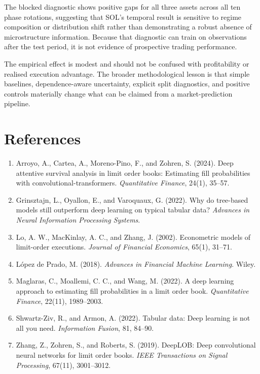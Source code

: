 \documentclass[11pt]{article}
\begin{document}
The blocked diagnostic shows positive gaps for all three assets across all ten phase rotations, suggesting that SOL's temporal result is sensitive to regime composition or distribution shift rather than demonstrating a robust absence of microstructure information. Because that diagnostic can train on observations after the test period, it is not evidence of prospective trading performance.

The empirical effect is modest and should not be confused with profitability or realised execution advantage. The broader methodological lesson is that simple baselines, dependence-aware uncertainty, explicit split diagnostics, and positive controls materially change what can be claimed from a market-prediction pipeline.

\section*{References}
\begin{enumerate}[label={},leftmargin=0pt,itemsep=0.45em,parsep=0pt]
\item Arroyo, A., Cartea, A., Moreno-Pino, F., and Zohren, S. (2024). Deep attentive survival analysis in limit order books: Estimating fill probabilities with convolutional-transformers. \emph{Quantitative Finance}, 24(1), 35--57.
\item Grinsztajn, L., Oyallon, E., and Varoquaux, G. (2022). Why do tree-based models still outperform deep learning on typical tabular data? \emph{Advances in Neural Information Processing Systems}.
\item Lo, A. W., MacKinlay, A. C., and Zhang, J. (2002). Econometric models of limit-order executions. \emph{Journal of Financial Economics}, 65(1), 31--71.
\item López de Prado, M. (2018). \emph{Advances in Financial Machine Learning}. Wiley.
\item Maglaras, C., Moallemi, C. C., and Wang, M. (2022). A deep learning approach to estimating fill probabilities in a limit order book. \emph{Quantitative Finance}, 22(11), 1989--2003.
\item Shwartz-Ziv, R., and Armon, A. (2022). Tabular data: Deep learning is not all you need. \emph{Information Fusion}, 81, 84--90.
\item Zhang, Z., Zohren, S., and Roberts, S. (2019). DeepLOB: Deep convolutional neural networks for limit order books. \emph{IEEE Transactions on Signal Processing}, 67(11), 3001--3012.
\end{enumerate}
\end{document}
